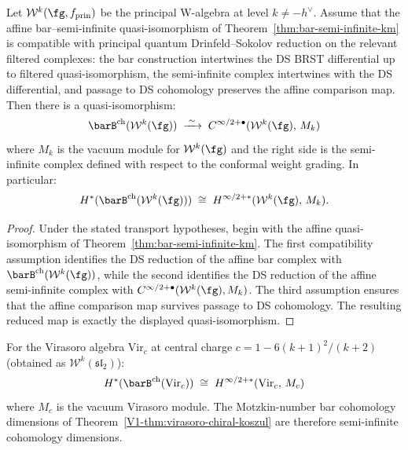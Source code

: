 \begin{theorem}[DS transport of bar = semi-infinite for principal \texorpdfstring{$\mathcal{W}$}{W}-algebras;
\ClaimStatusConditional]
\label{thm:bar-semi-infinite-w}
Let $\mathcal{W}^k(\fg, f_{\mathrm{prin}})$ be the principal
W-algebra at level $k \neq -h^\vee$. Assume that the affine
bar--semi-infinite quasi-isomorphism of
Theorem~\ref{thm:bar-semi-infinite-km} is compatible with principal
quantum Drinfeld--Sokolov reduction on the relevant filtered
complexes: the bar construction intertwines the DS BRST
differential up to filtered quasi-isomorphism, the semi-infinite
complex intertwines with the DS differential, and passage to DS
cohomology preserves the affine comparison map. Then there is a
quasi-isomorphism:
\begin{equation}\label{eq:bar-semi-infinite-w}
\barB^{\mathrm{ch}}(\mathcal{W}^k(\fg))
\;\xrightarrow{\;\sim\;}\;
C^{\infty/2+\bullet}(\mathcal{W}^k(\fg),\, M_k)
\end{equation}
where $M_k$ is the vacuum module for $\mathcal{W}^k(\fg)$ and the
right side is the semi-infinite complex defined with respect to the
conformal weight grading. In particular:
\[
H^*(\barB^{\mathrm{ch}}(\mathcal{W}^k(\fg)))
\;\cong\;
H^{\infty/2+*}(\mathcal{W}^k(\fg),\, M_k).
\]
\end{theorem}

\begin{proof}
Under the stated transport hypotheses, begin with the affine
quasi-isomorphism of Theorem~\ref{thm:bar-semi-infinite-km}. The
first compatibility assumption identifies the DS reduction of the
affine bar complex with
$\barB^{\mathrm{ch}}(\mathcal{W}^k(\fg))$, while the second
identifies the DS reduction of the affine semi-infinite complex with
$C^{\infty/2+\bullet}(\mathcal{W}^k(\fg), M_k)$. The third
assumption ensures that the affine comparison map survives passage to
DS cohomology. The resulting reduced map is exactly the displayed
quasi-isomorphism.
\end{proof}

\begin{corollary}[Virasoro bar complex = semi-infinite complex;
\ClaimStatusConditional]
\label{cor:virasoro-semi-infinite}
For the Virasoro algebra $\mathrm{Vir}_c$ at central charge
$c = 1 - 6(k+1)^2/(k+2)$ \textup{(}obtained as
$\mathcal{W}^k(\mathfrak{sl}_2)$\textup{)}:
\[
H^*(\barB^{\mathrm{ch}}(\mathrm{Vir}_c))
\;\cong\;
H^{\infty/2+*}(\mathrm{Vir}_c,\, M_c)
\]
where $M_c$ is the vacuum Virasoro module. The Motzkin-number
bar cohomology dimensions of
Theorem~\textup{\ref{V1-thm:virasoro-chiral-koszul}} are therefore
semi-infinite cohomology dimensions.
\end{corollary}

